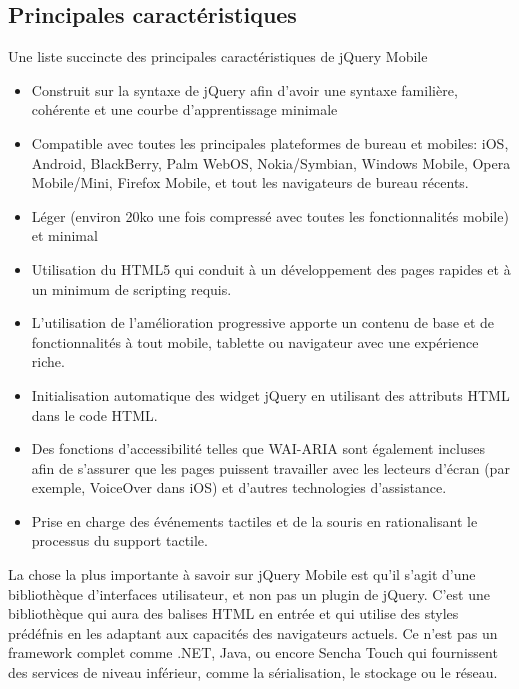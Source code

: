 \subsection{Principales caractéristiques}

Une liste succincte des principales caractéristiques de jQuery Mobile

\begin{itemize}
  \item[\textbullet]
  Construit sur la syntaxe de jQuery afin d’avoir une syntaxe familière, cohérente et une courbe d’apprentissage minimale
  
  \item[\textbullet]
  Compatible avec toutes les principales plateformes de bureau et mobiles: iOS, Android, BlackBerry, Palm WebOS, Nokia/Symbian, Windows Mobile, Opera Mobile/Mini, Firefox Mobile, et tout les navigateurs de bureau récents.
  
  \item[\textbullet]
  Léger (environ 20ko une fois compressé avec toutes les fonctionnalités mobile) et minimal
  
  \item[\textbullet]
  Utilisation du HTML5 qui conduit à un développement des pages rapides et à un minimum de scripting requis.
  
  \item[\textbullet]
  L’utilisation de l’amélioration progressive apporte un contenu de base et de fonctionnalités à tout mobile, tablette ou navigateur avec une expérience riche.
  
  \item[\textbullet]
  Initialisation automatique des widget jQuery en utilisant des attributs HTML dans le code HTML.
  
  \item[\textbullet]
  Des fonctions d'accessibilité telles que WAI-ARIA sont également incluses afin de s’assurer que les pages puissent travailler avec les lecteurs d’écran (par exemple, VoiceOver dans iOS) et d’autres technologies d’assistance.
  
  \item[\textbullet]
  Prise en charge des événements tactiles et de la souris en rationalisant le processus du support tactile.
  
\end{itemize}


La chose la plus importante à savoir sur jQuery Mobile est qu’il s'agit d'une bibliothèque d’interfaces utilisateur, et non pas un plugin de jQuery. C’est une bibliothèque qui aura des balises HTML en entrée et qui utilise des styles prédéfnis en les adaptant aux capacités des navigateurs actuels. Ce n’est pas un framework complet comme .NET, Java, ou encore Sencha Touch qui fournissent des services de niveau inférieur, comme la sérialisation, le stockage ou le réseau.

